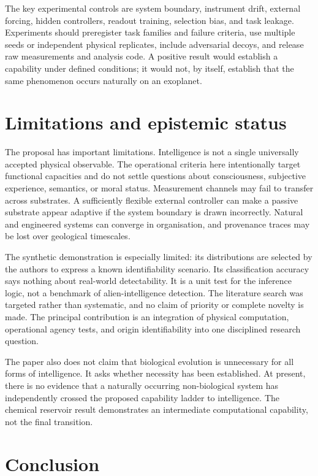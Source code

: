 \documentclass[11pt]{article}
\begin{document}
The key experimental controls are system boundary, instrument drift, external forcing, hidden controllers, readout training, selection bias, and task leakage. Experiments should preregister task families and failure criteria, use multiple seeds or independent physical replicates, include adversarial decoys, and release raw measurements and analysis code. A positive result would establish a capability under defined conditions; it would not, by itself, establish that the same phenomenon occurs naturally on an exoplanet.

\section{Limitations and epistemic status}

The proposal has important limitations. Intelligence is not a single universally accepted physical observable. The operational criteria here intentionally target functional capacities and do not settle questions about consciousness, subjective experience, semantics, or moral status. Measurement channels may fail to transfer across substrates. A sufficiently flexible external controller can make a passive substrate appear adaptive if the system boundary is drawn incorrectly. Natural and engineered systems can converge in organisation, and provenance traces may be lost over geological timescales.

The synthetic demonstration is especially limited: its distributions are selected by the authors to express a known identifiability scenario. Its classification accuracy says nothing about real-world detectability. It is a unit test for the inference logic, not a benchmark of alien-intelligence detection. The literature search was targeted rather than systematic, and no claim of priority or complete novelty is made. The principal contribution is an integration of physical computation, operational agency tests, and origin identifiability into one disciplined research question.

The paper also does not claim that biological evolution is unnecessary for all forms of intelligence. It asks whether necessity has been established. At present, there is no evidence that a naturally occurring non-biological system has independently crossed the proposed capability ladder to intelligence. The chemical reservoir result demonstrates an intermediate computational capability, not the final transition.

\section{Conclusion}
\end{document}
